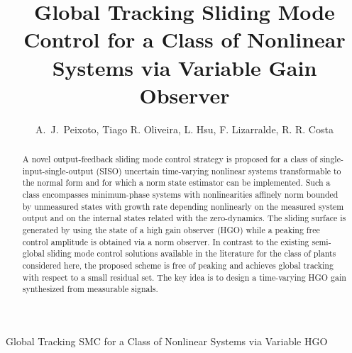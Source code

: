 \documentclass{rncauth}
\begin{document}

{Global Tracking SMC for a Class of Nonlinear Systems via
Variable HGO}

\title{Global Tracking Sliding Mode Control for a Class of Nonlinear Systems via
Variable Gain Observer}%

\author{A.~J.~Peixoto, Tiago R. Oliveira, L. Hsu, F. Lizarralde, R. R. Costa}


\address{ Dept. of Electrical Eng./CEFET-RJ, Federal Center of Tech. Celso Suckow da Fonseca, 
Rio de Janeiro, Brazil. \\  Dept. of Electrical Eng./COPPE, Federal University of Rio de Janeiro, Rio de Janeiro, Brazil.}







\noreceived{}
\norevised{}
\noaccepted{}


\begin{abstract}
A novel output-feedback sliding mode control strategy is proposed
for a class of single-input-single-output (SISO) uncertain
time-varying nonlinear systems transformable to the normal form and
for which a norm state estimator can be implemented. Such a class
encompasses minimum-phase systems with nonlinearities affinely norm
bounded by unmeasured states with growth rate depending nonlinearly
on the measured system output and on the internal states related
with the zero-dynamics. The sliding surface is generated by using
the state of a high gain observer (HGO) while a peaking free control
amplitude is obtained via a norm observer. In contrast to the
existing semi-global sliding mode control solutions available in the
literature for the class of plants considered here, the proposed
scheme is free of peaking and achieves global tracking with respect
to a small residual set. The key idea is to design a time-varying
HGO gain synthesized from measurable signals.

\end{abstract}
\end{document}
